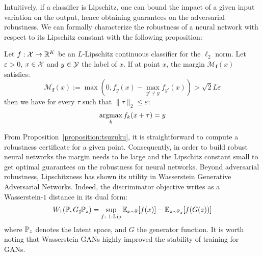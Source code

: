 Intuitively, if a classifier is Lipschitz, one can bound the impact of a given input variation on the output, hence obtaining guarantees on the adversarial robustness.
We can formally characterize the robustness of a neural network with respect to its Lipschitz constant with the following proposition:
\begin{prop} \label{proposition:tsuzuku}
Let $f:\mathcal{X}\to\mathbb{R}^K$ be an $L$-Lipschitz continuous classifier for the $\ell_2$ norm.
Let $\varepsilon > 0$, $x \in \mathcal{X}$ and $y \in \mathcal{Y}$ the label of $x$.
If at point $x$, the margin $\mathcal{M}_{\mathbf{f}}(x)$ satisfies:
\begin{equation*}
  \mathcal{M}_{\mathbf{f}}(x):=\max(0,f_y(x)-\max_{y'\neq y}f_{y'}(x)) > \sqrt{2} L \varepsilon
\end{equation*}
then we have for every $\tau$ such that $\lVert \tau \rVert_2 \leq \varepsilon$:
\begin{equation*}
  \operatorname*{argmax}_{k}f_k(x + \tau) = y
\end{equation*}
\end{prop}
From Proposition~\ref{proposition:tsuzuku}, it is straightforward to compute a robustness certificate for a given point.
Consequently, in order to build robust neural networks the margin needs to be large and the Lipschitz constant small to get optimal guarantees on the robustness for neural networks. Beyond adversarial robustness, Lipschitzness has shown its utility in Wasserstein Generative Adversarial Networks. Indeed, the discriminator objective writes as a Wasserstein-$1$ distance in its dual form:
\begin{align*}
  W_1(\mathbb{P},G_\sharp \mathbb{P}_z) = \sup_{f:~1\text{-Lip}}\mathbb{E}_{x\sim\mathbb{P}}[f(x)] -\mathbb{E}_{z\sim\mathbb{P}_z}[f(G(z))]
\end{align*}
where $\mathbb{P}_z$ denotes the latent space, and $G$ the generator function. It is worth noting that Wasserstein GANs highly improved the stability of training for GANs. 
